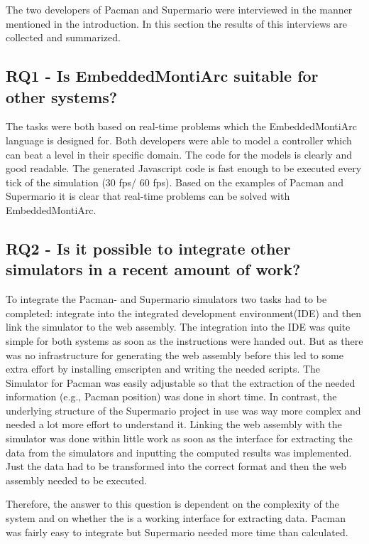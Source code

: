 The two developers of Pacman and Supermario were interviewed in the manner mentioned in the introduction. In this section the results of this interviews are collected and summarized.

\subsection{RQ1 - Is EmbeddedMontiArc suitable for other systems?}
The tasks were both based on real-time problems which the EmbeddedMontiArc language is designed for. Both developers were able to model a controller which can beat a level in their specific domain. The code for the models is clearly and good readable. The generated Javascript code is fast enough to be executed every tick of the simulation (30 fps/ 60 fps). Based on the examples of Pacman and Supermario it is clear that real-time problems can be solved with EmbeddedMontiArc.

\subsection{RQ2 - Is it possible to integrate other simulators in a recent amount of work?}
To integrate the Pacman- and Supermario simulators two tasks had to be completed: integrate into the integrated development environment(IDE) and then link the simulator to the web assembly. The integration into the IDE was quite simple for both systems as soon as the instructions were handed out. But as there was no infrastructure for generating the web assembly before this led to some extra effort by installing emscripten and writing the needed scripts. The Simulator for Pacman was easily adjustable so that the extraction of the needed information (e.g., Pacman position) was done in short time. In contrast, the underlying structure of the Supermario project in use was way more complex and needed a lot more effort to understand it. Linking the web assembly with the simulator was done within little work as soon as the interface for extracting the data from the simulators and inputting the computed results was implemented. Just the data had to be transformed into the correct format and then the web assembly needed to be executed.

Therefore, the answer to this question is dependent on the complexity of the system and on whether the is a working interface for extracting data. Pacman was fairly easy to integrate but Supermario needed more time than calculated.

